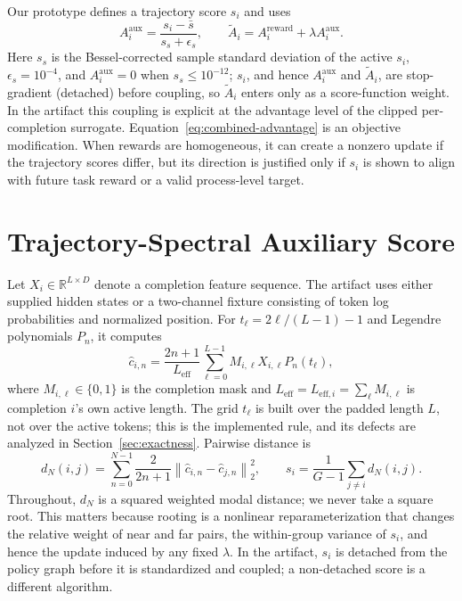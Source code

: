 \documentclass{article}
\begin{document}
Our prototype defines a trajectory score $s_i$ and uses
\begin{equation}
  A_i^{\mathrm{aux}}
  = \frac{s_i-\bar s}{s_s+\epsilon_s},
  \qquad
  \widetilde A_i
  = A_i^{\mathrm{reward}}+\lambda A_i^{\mathrm{aux}}.
  \label{eq:combined-advantage}
\end{equation}
Here $s_s$ is the Bessel-corrected sample standard deviation of the active
$s_i$, $\epsilon_s=10^{-4}$, and $A_i^{\mathrm{aux}}=0$ when $s_s\leq10^{-12}$;
$s_i$, and hence $A_i^{\mathrm{aux}}$ and $\widetilde A_i$, are stop-gradient
(detached) before coupling, so $\widetilde A_i$ enters only as a score-function
weight.  In the artifact this coupling is explicit at the advantage level of
the clipped per-completion surrogate.
Equation~\eqref{eq:combined-advantage} is an objective modification.  When
rewards are homogeneous, it can create a nonzero update if the trajectory
scores differ, but its direction is justified only if $s_i$ is shown to align
with future task reward or a valid process-level target.

\section{Trajectory-Spectral Auxiliary Score}

Let $X_i\in\mathbb{R}^{L\times D}$ denote a completion feature sequence.  The
artifact uses either supplied hidden states or a two-channel fixture consisting
of token log probabilities and normalized position.  For
$t_\ell=2\ell/(L-1)-1$ and Legendre polynomials $P_n$, it computes
\begin{equation}
  \widehat c_{i,n}
  = \frac{2n+1}{L_{\mathrm{eff}}}
    \sum_{\ell=0}^{L-1} M_{i,\ell}X_{i,\ell}P_n(t_\ell),
  \label{eq:discrete-coeff}
\end{equation}
where $M_{i,\ell}\in\{0,1\}$ is the completion mask and
$L_{\mathrm{eff}}=L_{\mathrm{eff},i}=\sum_\ell M_{i,\ell}$ is completion $i$'s own
active length.  The grid $t_\ell$ is built over the padded length $L$, not over
the active tokens; this is the implemented rule, and its defects are analyzed
in Section~\ref{sec:exactness}.  Pairwise distance is
\begin{equation}
  d_N(i,j)=\sum_{n=0}^{N-1}
  \frac{2}{2n+1}\left\|\widehat c_{i,n}-\widehat c_{j,n}\right\|_2^2,
  \qquad
  s_i=\frac{1}{G-1}\sum_{j\ne i}d_N(i,j).
\end{equation}
Throughout, $d_N$ is a squared weighted modal distance; we never take a square
root.  This matters because rooting is a nonlinear reparameterization that
changes the relative weight of near and far pairs, the within-group variance of
$s_i$, and hence the update induced by any fixed $\lambda$.  In the artifact,
$s_i$ is detached from the policy graph before it is standardized and coupled;
a non-detached score is a different algorithm.
\end{document}
